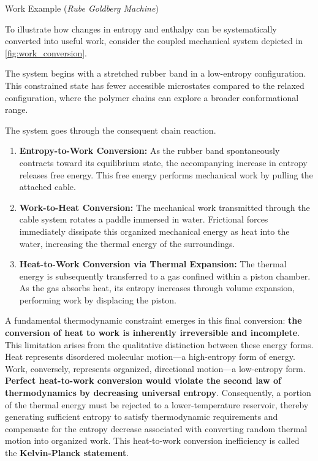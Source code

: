 \documentclass[10pt]{article}
\begin{document}
    \begin{core}{Work Example (\textit{Rube Goldberg Machine})}

      To illustrate how changes in entropy and enthalpy can be systematically converted into useful work, consider the coupled mechanical system depicted in \autoref{fig:work_conversion}.


      The system begins with a stretched rubber band in a low-entropy configuration. This constrained state has fewer accessible microstates compared to the relaxed configuration, where the polymer chains can explore a broader conformational range. 

      The system goes through the consequent chain reaction.

      \begin{enumerate}

        \item \textbf{Entropy-to-Work Conversion:} As the rubber band spontaneously contracts toward its equilibrium state, the accompanying increase in entropy releases free energy. This free energy performs mechanical work by pulling the attached cable.

        \item \textbf{Work-to-Heat Conversion:} The mechanical work transmitted through the cable system rotates a paddle immersed in water. Frictional forces immediately dissipate this organized mechanical energy as heat into the water, increasing the thermal energy of the surroundings.

        \item \textbf{Heat-to-Work Conversion via Thermal Expansion:} The thermal energy is subsequently transferred to a gas confined within a piston chamber. As the gas absorbs heat, its entropy increases through volume expansion, performing work by displacing the piston.

      \end{enumerate}

      A fundamental thermodynamic constraint emerges in this final conversion: \textbf{the conversion of heat to work is inherently irreversible and incomplete}. This limitation arises from the qualitative distinction between these energy forms. Heat represents disordered molecular motion---a high-entropy form of energy. Work, conversely, represents organized, directional motion---a low-entropy form. \textbf{Perfect heat-to-work conversion would violate the second law of thermodynamics by decreasing universal entropy}. Consequently, a portion of the thermal energy must be rejected to a lower-temperature reservoir, thereby generating sufficient entropy to satisfy thermodynamic requirements and compensate for the entropy decrease associated with converting random thermal motion into organized work. This heat-to-work conversion inefficiency is called the \textbf{Kelvin-Planck statement}.

    \end{core}
\end{document}
